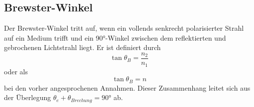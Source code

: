 \subsection{Brewster-Winkel}
\label{subsec:brewster}
Der Brewster-Winkel tritt auf, wenn ein vollends senkrecht polarisierter Strahl 
auf ein Medium trifft und ein 90°-Winkel zwischen dem reflektierten und
gebrochenen Lichtstrahl liegt. Er ist definiert durch
\begin{equation}
    \label{eqn:8}
    \tan{\theta_B} = \frac{n_2}{n_1}
\end{equation}
oder als
\begin{equation}
    \label{eqn:8}
    \tan{\theta_B} = n
\end{equation}
bei den vorher angesprochenen Annahmen. Dieser Zusammenhang leitet 
sich aus der Überlegung $\theta_e + \theta_{Brechung} = 90°$ ab.
